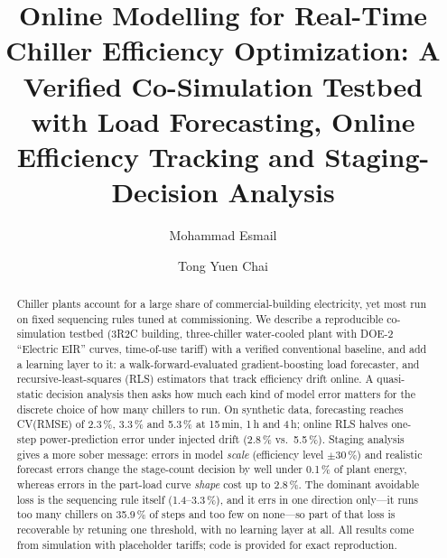 \documentclass{svproc}
\begin{document}
\mainmatter
\title{Online Modelling for Real-Time Chiller Efficiency Optimization: A Verified Co-Simulation Testbed with Load Forecasting, Online Efficiency Tracking and Staging-Decision Analysis}
\author{Mohammad Esmail \and Tong Yuen Chai}
\maketitle

\begin{abstract}
Chiller plants account for a large share of commercial-building electricity, yet most run on fixed sequencing rules tuned at commissioning. We describe a reproducible co-simulation testbed (3R2C building, three-chiller water-cooled plant with DOE-2 ``Electric EIR'' curves, time-of-use tariff) with a verified conventional baseline, and add a learning layer to it: a walk-forward-evaluated gradient-boosting load forecaster, and recursive-least-squares (RLS) estimators that track efficiency drift online. A quasi-static decision analysis then asks how much each kind of model error matters for the discrete choice of how many chillers to run. On synthetic data, forecasting reaches CV(RMSE) of 2.3\,\%, 3.3\,\% and 5.3\,\% at 15\,min, 1\,h and 4\,h; online RLS halves one-step power-prediction error under injected drift (2.8\,\% vs.\ 5.5\,\%). Staging analysis gives a more sober message: errors in model \emph{scale} (efficiency level $\pm30\,\%$) and realistic forecast errors change the stage-count decision by well under 0.1\,\% of plant energy, whereas errors in the part-load curve \emph{shape} cost up to 2.8\,\%. The dominant avoidable loss is the sequencing rule itself (1.4--3.3\,\%), and it errs in one direction only---it runs too many chillers on 35.9\,\% of steps and too few on none---so part of that loss is recoverable by retuning one threshold, with no learning layer at all. All results come from simulation with placeholder tariffs; code is provided for exact reproduction.
\end{abstract}
\end{document}
